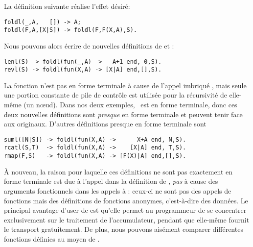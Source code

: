 La définition suivante réalise l'effet désiré:
\begin{verbatim}
foldl(_,A,   []) -> A;
foldl(F,A,[X|S]) -> foldl(F,F(X,A),S).
\end{verbatim}
Nous pouvons alors écrire de nouvelles définitions de 
et :
\begin{verbatim}
lenl(S) -> foldl(fun(_,A) ->   A+1 end, 0,S).
revl(S) -> foldl(fun(X,A) -> [X|A] end,[],S).
\end{verbatim}
La fonction  n'est pas en forme terminale à cause de
l'appel imbriqué , mais seule une portion constante de
pile de contrôle est utilisée pour la récursivité de 
elle-même (un n{\oe}ud). Dans nos deux exemples, ~est en
forme terminale, donc ces deux nouvelles définitions sont
\emph{presque} en forme terminale et peuvent tenir face aux
originaux. D'autres définitions presque en forme terminale sont
\begin{verbatim}
suml([N|S]) -> foldl(fun(X,A) ->      X+A end, N,S).
rcatl(S,T)  -> foldl(fun(X,A) ->    [X|A] end, T,S).
rmap(F,S)   -> foldl(fun(X,A) -> [F(X)|A] end,[],S).
\end{verbatim}
À nouveau, la raison pour laquelle ces définitions ne sont pas
exactement en forme terminale est due à l'appel  dans
la définition de , \emph{pas} à cause des arguments
fonctionnels  dans les appels à
: ceux-ci ne sont pas des appels de fonctions mais
des définitions de fonctions anonymes, c'est-à-dire des données. Le
principal avantage d'user de  est qu'elle permet au
programmeur de se concentrer exclusivement sur le traitement de
l'accumulateur, pendant que  elle-même fournit le
transport gratuitement. De plus, nous pouvons aisément comparer
différentes fonctions définies au moyen de .

